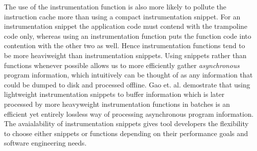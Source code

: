 The use of the instrumentation function is also more likely to pollute the instruction cache more than using a compact
instrumentation snippet. For an instrumentation snippet the application code must contend with the trampoline code
only, whereas using an instrumentation function puts the function code into contention with the other two as well. Hence 
instrumentation functions tend to be more heaviweight than instrumentation snippets. Using snippets rather than functions 
whenever possible allows us to more efficiently gather 
\textit{asynchronous} program information, which intuitively can be thought of as any information that could be dumped to
disk and processed offline. Gao et. al. \cite{gao2005aliter} demostrate that using lightweight instrumentation snippets 
to buffer information which is later processed by more heavyweight instrumentation functions in batches is an efficient
yet entirely lossless way of processing asynchronous program information. The avaialability of instrumentation 
snippets gives tool developers the flexibility to choose either snippets or functions
depending on their performance goals and software engineering needs.

